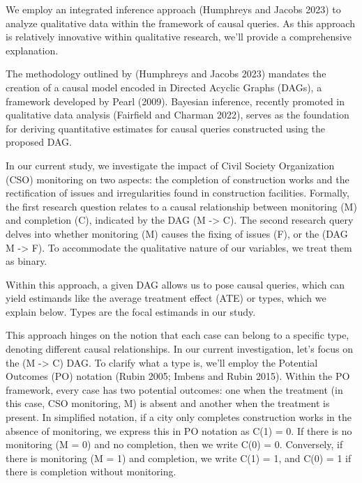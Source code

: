 \documentclass[]{AEA}
\begin{document}
We employ an integrated inference approach (Humphreys and Jacobs 2023)
to analyze qualitative data within the framework of causal queries. As
this approach is relatively innovative within qualitative research,
we'll provide a comprehensive explanation.

The methodology outlined by (Humphreys and Jacobs 2023) mandates the
creation of a causal model encoded in Directed Acyclic Graphs (DAGs), a
framework developed by Pearl (2009). Bayesian inference, recently
promoted in qualitative data analysis (Fairfield and Charman 2022),
serves as the foundation for deriving quantitative estimates for causal
queries constructed using the proposed DAG.

In our current study, we investigate the impact of Civil Society
Organization (CSO) monitoring on two aspects: the completion of
construction works and the rectification of issues and irregularities
found in construction facilities. Formally, the first research question
relates to a causal relationship between monitoring (M) and completion
(C), indicated by the DAG (M -\textgreater{} C). The second research
query delves into whether monitoring (M) causes the fixing of issues
(F), or the (DAG M -\textgreater{} F). To accommodate the qualitative
nature of our variables, we treat them as binary.

Within this approach, a given DAG allows us to pose causal queries,
which can yield estimands like the average treatment effect (ATE) or
types, which we explain below. Types are the focal estimands in our
study.

This approach hinges on the notion that each case can belong to a
specific type, denoting different causal relationships. In our current
investigation, let's focus on the (M -\textgreater{} C) DAG. To clarify
what a type is, we'll employ the Potential Outcomes (PO) notation (Rubin
2005; Imbens and Rubin 2015). Within the PO framework, every case has
two potential outcomes: one when the treatment (in this case, CSO
monitoring, M) is absent and another when the treatment is present. In
simplified notation, if a city only completes construction works in the
absence of monitoring, we express this in PO notation as C(1) = 0. If
there is no monitoring (M = 0) and no completion, then we write C(0) =
0. Conversely, if there is monitoring (M = 1) and completion, we write
C(1) = 1, and C(0) = 1 if there is completion without monitoring.
\end{document}
